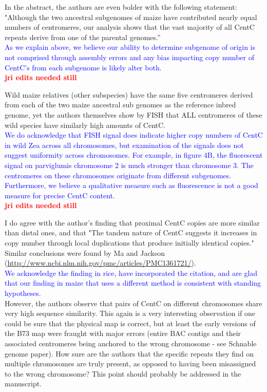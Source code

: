 \documentclass[]{article}
\newcommand{\res}[1]{\noindent \textcolor{blue}{{#1}} \\}
\newcommand{\jri}[1]{\textcolor{red}{{\bf #1}} }
\begin{document}
In the abstract, the authors are even bolder with the following statement: "Although the two ancestral subgenomes of maize have contributed nearly equal numbers of centromeres, our analysis shows that the vast majority of all CentC repeats derive from one of the parental genomes.”\\

\res{As we explain above, we believe our ability to determine subgenome of origin is not comprised through assembly errors and any bias impacting copy number of CentC’s from each subgenome is likely alter both.}\jri{jri edits needed still}

Wild maize relatives (other subspecies) have the same five centromeres derived from each of the two maize ancestral sub genomes as the reference inbred genome, yet the authors themselves show by FISH that ALL centromeres of these wild species have similarly high amounts of CentC.\\

\res{We do acknowledge that FISH signal does indicate higher copy numbers of CentC in wild Zea across all chromosomes, but examination of the signals does not suggest uniformity across chromosomes.  For example, in figure 4B, the fluorescent signal on parviglumis chromosome 2 is much stronger than chromosome 3.  The centromeres on these chromosomes originate from different subgenomes.  Furthermore, we believe a qualitative measure such as fluorescence is not a good measure for precise CentC content.} \jri{jri edits needed still}

I do agree with the author's finding that proximal CentC copies are more similar than distal ones, and that "The tandem nature of CentC suggests it increases in copy number through local duplications that produce initially identical copies." Similar conclusions were found by Ma and Jackson (\url{http://www.ncbi.nlm.nih.gov/pmc/articles/PMC1361721/}).\\

\res{We acknowledge the finding in rice, have incorporated the citation, and are glad that our finding in maize that uses a different method is consistent with standing hypotheses.}

However, the authors observe that pairs of  CentC on different chromosomes share very high sequence similarity.  This again is a very interesting observation if one could be sure that the physical map is correct, but at least the early versions of the B73 map were fraught with major errors (entire BAC contigs and their associated centromeres being anchored to the wrong chromosome - see Schnable genome paper).  How sure are the authors that the specific repeats they find on multiple chromosomes are truly present, as opposed to having been misassigned to the wrong chromosome? This point should probably be addressed in the manuscript.\\
\end{document}
